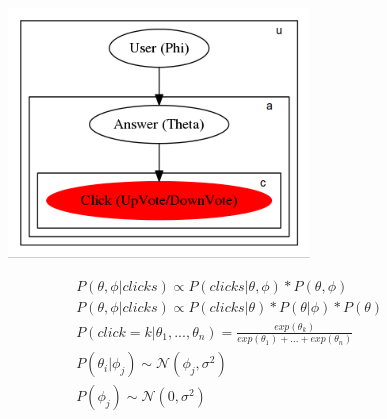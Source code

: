 \documentclass[sansserif,mathserif]{beamer}
\begin{document}
\begin{frame}
\begin{columns}
\begin{column}{0.309\textwidth}
\begin{center}
\includegraphics[width=0.7\textwidth]{gm.png} 
\vspace{-0.7cm}
\end{center}

\begin{equation*}
\begin{split}
    &P(\theta, \phi | clicks) \propto P(clicks | \theta, \phi) * P(\theta,\phi)\\
    &P(\theta, \phi | clicks) \propto P(clicks | \theta) * P(\theta | \phi)
    * P(\theta)\\
    &P(click = k | \theta_1, ..., \theta_n) = \frac{exp(\theta_k)}{exp(\theta_1) + ... + exp(\theta_n)} \\
    &P(\theta_i | \phi_j) \sim \mathcal{N}(\phi_j, \sigma^2) \\
    &P(\phi_j) \sim \mathcal{N}(0, \sigma^2) \\
\end{split}
\end{equation*}\\

\vspace{0.2cm}
\end{column}


\begin{column}{0.309\textwidth}
\vspace{-1.4cm}


\end{column}
\end{columns}
\end{frame}
\end{document}
